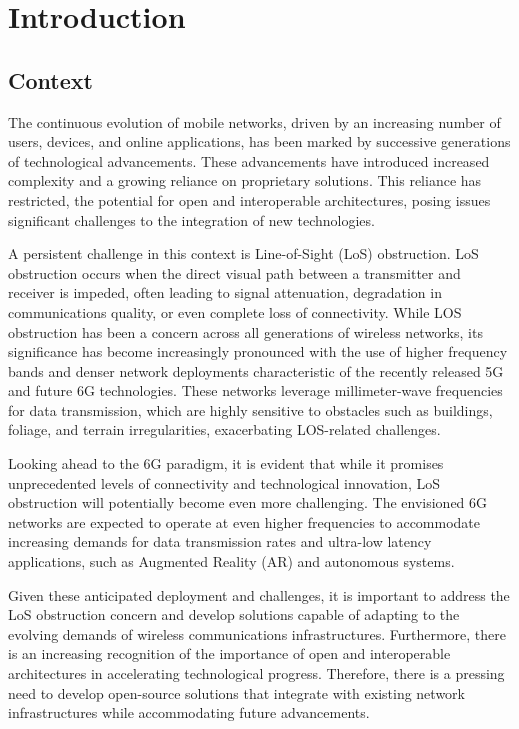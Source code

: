 \chapter{Introduction} \label{ch:intro}

\section{Context}\label{sec:context}

The continuous evolution of mobile networks, driven by an increasing number of users, devices, and online applications, has been marked by successive generations of technological advancements.
These advancements have introduced increased complexity and a growing reliance on proprietary solutions.
This reliance has restricted, the potential for open and interoperable architectures, posing issues significant challenges to the integration of new technologies.

A persistent challenge in this context is Line-of-Sight (LoS) obstruction.
LoS obstruction occurs when the direct visual path between a transmitter and receiver is impeded, often leading to signal attenuation, degradation in communications quality, or even complete loss of connectivity.
While LOS obstruction has been a concern across all generations of wireless networks, its significance has become increasingly pronounced with the use of higher frequency bands and denser network deployments characteristic of the recently released 5G and future 6G technologies.
These networks leverage millimeter-wave frequencies for data transmission, which are highly sensitive to obstacles such as buildings, foliage, and terrain irregularities, exacerbating LOS-related challenges.

Looking ahead to the 6G paradigm, it is evident that while it promises unprecedented levels of connectivity and technological innovation,  LoS obstruction will potentially become even more challenging.
The envisioned 6G networks are expected to operate at even higher frequencies to accommodate increasing demands for data transmission rates and ultra-low latency applications, such as Augmented Reality (AR) and autonomous systems.

Given these anticipated deployment and challenges, it is important to address the  LoS obstruction concern and develop solutions capable of adapting to the evolving demands of wireless communications infrastructures.
Furthermore, there is an increasing recognition of the importance of open and interoperable architectures in accelerating technological progress.
Therefore, there is a pressing need to develop open-source solutions that integrate with existing network infrastructures while accommodating future advancements.

